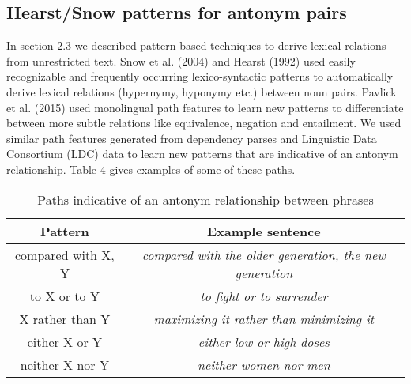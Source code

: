 \documentclass[11pt]{article}
\begin{document}
\subsection{Hearst/Snow patterns for antonym pairs}
In section 2.3 we described pattern based techniques to derive lexical relations from unrestricted text. Snow et al. (2004) and Hearst (1992) used easily recognizable and frequently occurring lexico-syntactic patterns to automatically derive lexical relations (hypernymy, hyponymy etc.) between noun pairs. Pavlick et al. (2015) used monolingual path features to learn new patterns to differentiate between more subtle relations like equivalence, negation and entailment. We used similar path features generated from dependency parses and Linguistic Data Consortium (LDC) data to learn new patterns that are indicative of an antonym relationship. Table 4 gives examples of some of these paths.
\begin{table*}
\centering
\begin{tabular}{|c|c|}
\hline
Pattern & Example sentence\\
\hline\hline
compared with X, Y & \textit{compared with the older generation, the new generation}\\
to X or to Y & \textit{to fight or to surrender}\\
X rather than Y & \textit{maximizing it rather than minimizing it}\\
either X or Y & \textit{either low or high doses}\\
neither X nor Y & \textit{neither women nor men}\\
\hline
\end{tabular}
\caption{Paths indicative of an antonym relationship between phrases}
\end{table*}
\end{document}
